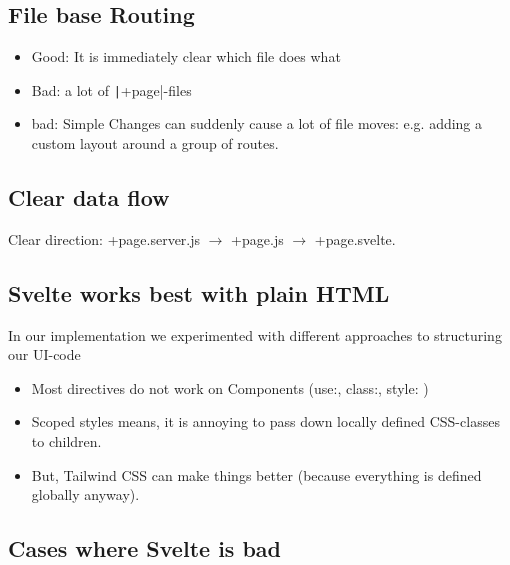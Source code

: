 \subsection{File base Routing}

\begin{itemize}
    \item Good: It is immediately clear which file does what
    \item Bad: a lot of \texttt|+page|-files
    \item bad: Simple Changes can suddenly cause a lot of file moves: e.g. adding a custom layout around a group of routes.
\end{itemize}

\subsection{Clear data flow}

Clear direction: +page.server.js $\rightarrow$ +page.js $\rightarrow$ +page.svelte.

\subsection{Svelte works best with plain HTML}

In our implementation we experimented with different approaches to structuring our UI-code

\begin{itemize}
    \item Most directives do not work on Components (use:, class:, style: )
    \item Scoped styles means, it is annoying to pass down locally defined CSS-classes to children.
    \item But, Tailwind CSS can make things better (because everything is defined globally anyway).
\end{itemize}


\subsection{Cases where Svelte is bad}


